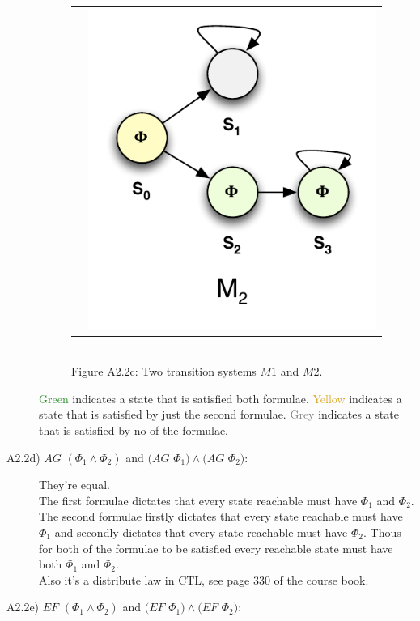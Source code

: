 \documentclass[12pt]{report}
\begin{document}
\begin{description}
\begin{figure}[H]
\begin{tabular}{ l r }
			& \includegraphics[scale=0.75]{../GFX/Answer-A2-2c-2.pdf}
		\end{tabular}\\
		Figure A2.2c: Two transition systems $M1$ and $M2$.
	\end{figure}
	\textcolor{ForestGreen}{Green} indicates a state that is satisfied both formulae. \textcolor{Goldenrod}{Yellow} indicates a state that is satisfied by just the second formulae. \textcolor{Grey}{Grey} indicates a state that is satisfied by no of the formulae.
	
	\item[A2.2d) $AG$ $(\Phi_1 \wedge \Phi_2)$ and $(AG$ $\Phi_1) \wedge (AG$ $\Phi_2)$:] They're equal.\\
		The first formulae dictates that every state reachable must have $\Phi_1$ and $\Phi_2$. The second formulae firstly dictates that every state reachable must have $\Phi_1$ and secondly dictates that every state reachable must have $\Phi_2$. Thous for both of the formulae to be satisfied every reachable state must have both $\Phi_1$ and $\Phi_2$.\\
		Also it's a distribute law in CTL, see page 330 of the course book.
		
	\item[A2.2e) $EF$ $(\Phi_1 \wedge \Phi_2)$ and $(EF$ $\Phi_1) \wedge (EF$ $\Phi_2)$:]
\end{description}
\end{document}
